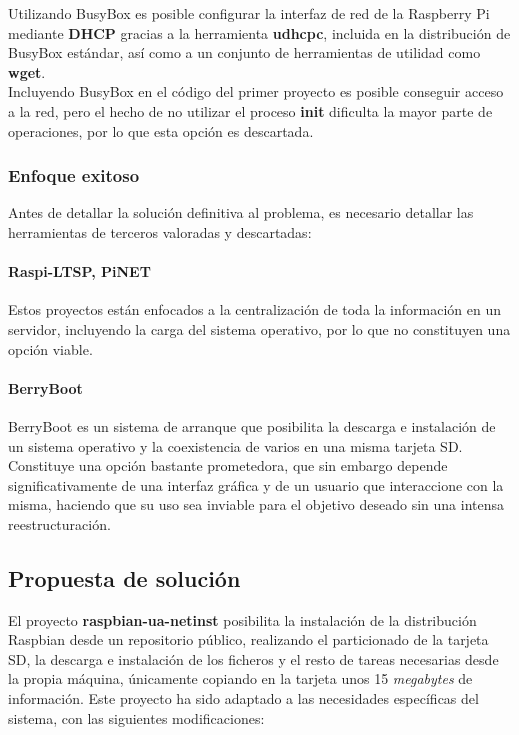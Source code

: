 \documentclass{article}
\begin{document}
Utilizando BusyBox es posible configurar la interfaz de red de la Raspberry Pi mediante \textbf{DHCP} gracias a la herramienta \textbf{udhcpc}, incluida en la distribución de BusyBox estándar, así como a un conjunto de herramientas de utilidad como \textbf{wget}.\\

Incluyendo BusyBox en el código del primer proyecto es posible conseguir acceso a la red, pero el hecho de no utilizar el proceso \textbf{init} dificulta la mayor parte de operaciones, por lo que esta opción es descartada.

\subsubsection{Enfoque exitoso}

Antes de detallar la solución definitiva al problema, es necesario detallar las herramientas de terceros valoradas y descartadas:

\paragraph{Raspi-LTSP, PiNET\\}

Estos proyectos\cite{raspiltsp, pinet} están enfocados a la centralización de toda la información en un servidor, incluyendo la carga del sistema operativo, por lo que no constituyen una opción viable.

\paragraph{BerryBoot\\}

BerryBoot\cite{berryboot} es un sistema de arranque que posibilita la descarga e instalación de un sistema operativo y la coexistencia de varios en una misma tarjeta SD. Constituye una opción bastante prometedora, que sin embargo depende significativamente de una interfaz gráfica y de un usuario que interaccione con la misma, haciendo que su uso sea inviable para el objetivo deseado sin una intensa reestructuración.

\subsection{Propuesta de solución}

El proyecto \textbf{raspbian-ua-netinst}\cite{raspbian-ua-netinst} posibilita la instalación de la distribución Raspbian desde un repositorio público, realizando el particionado de la tarjeta SD, la descarga e instalación de los ficheros y el resto de tareas necesarias desde la propia máquina, únicamente copiando en la tarjeta unos 15 \textit{megabytes} de información. Este proyecto ha sido adaptado a las necesidades específicas del sistema, con las siguientes modificaciones:
\end{document}
